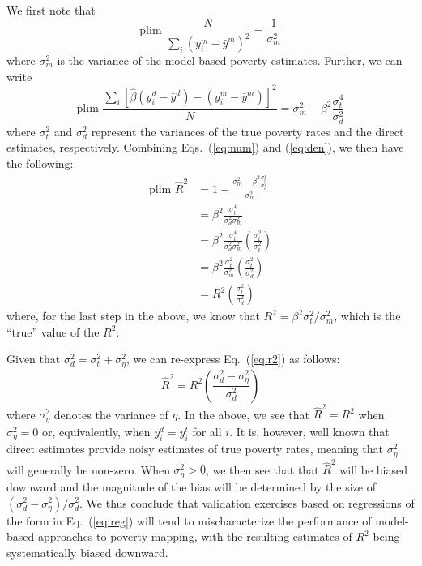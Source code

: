 \documentclass[english]{article}
\begin{document}
We first note that
\begin{equation}
\text{plim } \frac{N}{\sum_i (y_i^m - \bar{y}^m)^2} = \frac{1}{\sigma_m^2}
\label{eq:num}
\end{equation}
where $\sigma_m^2$ is the variance of the model-based poverty estimates.
Further, we can write
\begin{equation}
\text{plim }\frac{\sum_i\left[\hat{\beta}(y_i^d  - \bar{y}^d) - (y_i^m - \bar{y}^m)
 \right]^2}{N} =  \sigma_m^2 - \beta^2 \frac{\sigma_t^4}{\sigma_d^2}
 \label{eq:den}
\end{equation}
where $\sigma_t^2$ and $\sigma_d^2$ represent the variances of the true poverty rates and the direct 
estimates, respectively.
Combining Eqs.\ (\ref{eq:num}) and (\ref{eq:den}), we then have the following:
\begin{align}
\label{eq:r2}
\text{plim }\hat{R}^2 &= 1 - \frac{\sigma_m^2 - \beta^2 \frac{\sigma_t^4}{\sigma_d^2}}{\sigma_m^2} \\  \nonumber
& =  \beta^2 \frac{\sigma_t^4}{\sigma_d^2 \sigma_m^2} \\ \nonumber
& = \beta^2 \frac{\sigma_t^4}{\sigma_d^2 \sigma_m^2}\left(\frac{\sigma_t^2}{\sigma_t^2}\right) \\  \nonumber
& = \beta^2 \frac{\sigma_t^2}{ \sigma_m^2}\left(\frac{\sigma_t^2}{\sigma_d^2}\right) \\  \nonumber
& = R^2 \left(\frac{\sigma_t^2}{\sigma_d^2}\right)
\end{align}
where, for the last step in the above, we know that $R^2 = \beta^2 \sigma_t^2 / \sigma_m^2$, which is 
the ``true'' value of the $R^2$.

Given that $\sigma_d^2 = \sigma_t^2 + \sigma_\eta^2$, we can re-express Eq.\ (\ref{eq:r2}) as follows:
\begin{equation}
\hat{R}^2 = R^2 \left(\frac{\sigma_d^2 - \sigma_\eta^2}{\sigma_d^2}\right)
\end{equation}
where $\sigma_\eta^2$ denotes the variance of $\eta$.
In the above, we see that $\hat{R}^2 = R^2$ when $\sigma_\eta^2 = 0$ or, equivalently, when
$y_i^d = y_i^t$ for all $i$.
It is, however, well known that direct estimates provide noisy estimates of true poverty rates, 
meaning that $\sigma_\eta^2$ will generally be non-zero.
When $\sigma_\eta^2 > 0$, we then see that that $\hat{R}^2$ will be biased downward and the
magnitude of the bias will be determined by the size of $(\sigma_d^2 - \sigma_\eta^2)/ \sigma_d^2$.
We thus conclude that validation exercises based on regressions of the form in Eq.\ (\ref{eq:reg}) will
tend to mischaracterize the performance of model-based approaches to poverty mapping, with the 
resulting estimates of $R^2$ being systematically biased downward.
\end{document}
